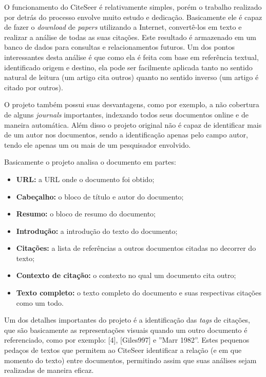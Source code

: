 O funcionamento do CiteSeer é relativamente simples, porém o trabalho realizado por detrás do processo envolve muito estudo e dedicação. Basicamente ele é capaz de fazer o \textit{download} de \textit{papers} utilizando a Internet, convertê-los em texto e realizar a análise de todas as suas citações. Este resultado é armazenado em um banco de dados para consultas e relacionamentos futuros. Um dos pontos interessantes desta análise é que como ela é feita com base em referência textual, identificado origem e destino, ela pode ser facilmente aplicada tanto no sentido natural de leitura (um artigo cita outros) quanto no sentido inverso (um artigo é citado por outros). 

O projeto também possui suas desvantagens, como por exemplo, a não cobertura de alguns \textit{journals} importantes, indexando todos seus documentos online e de maneira automática. Além disso o projeto original não é capaz de identificar mais de um autor nos documentos, sendo a identificação apenas pelo campo autor, tendo ele apenas um ou mais de um pesquisador envolvido.

Basicamente o projeto analisa o documento em partes:

\begin{itemize}
    \item \textbf{URL:} a URL onde o documento foi obtido;
    \item \textbf{Cabeçalho:} o bloco de título e autor do documento;
    \item \textbf{Resumo:} o bloco de resumo do documento;
    \item \textbf{Introdução:} a introdução do texto do documento;
    \item \textbf{Citações:} a lista de referências a outros documentos citadas no decorrer do texto;
    \item \textbf{Contexto de citação:} o contexto no qual um documento cita outro;
    \item \textbf{Texto completo:} o texto completo do documento e suas respectivas citações como um todo.
\end{itemize}

Um dos detalhes importantes do projeto é a identificação das \textit{tags} de citações, que são basicamente as representações visuais quando um outro documento é referenciado, como por exemplo: [4], [Giles997] e ''Marr 1982''. Estes pequenos pedaços de textos que permitem ao CiteSeer identificar a relação (e em que momento do texto) entre documentos, permitindo assim que suas análises sejam realizadas de maneira eficaz.

